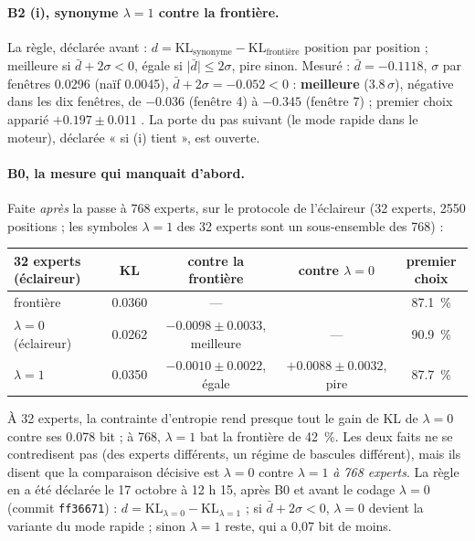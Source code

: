 \paragraph{B2 (i), synonyme $\lambda = 1$ contre la frontière.} La règle, déclarée avant : $d = \mathrm{KL}_{\text{synonyme}} - \mathrm{KL}_{\text{frontière}}$ position par position ; meilleure si $\bar d + 2\sigma < 0$, égale si $\lvert \bar d\rvert \le 2\sigma$, pire sinon. Mesuré : $\bar d = -\num{0.1118}$, $\sigma$ par fenêtres \num{0.0296} (naïf \num{0.0045}), $\bar d + 2\sigma = -\num{0.052} < 0$ : \textbf{meilleure} (\num{3.8}\,$\sigma$), négative dans les dix fenêtres, de $-\num{0.036}$ (fenêtre 4) à $-\num{0.345}$ (fenêtre 7) ; premier choix apparié $+\num{0.197} \pm \num{0.011}$ \mes. La porte du pas suivant (le mode rapide dans le moteur), déclarée « si (i) tient », est ouverte.

\paragraph{B0, la mesure qui manquait d'abord.} Faite \emph{après} la passe à 768 experts, sur le protocole de l'éclaireur (32 experts, \num{2550} positions ; les symboles $\lambda = 1$ des 32 experts sont un sous-ensemble des 768) \mes :

\begin{center}\footnotesize
\begin{tabular}{@{}lcccc@{}}
\toprule
32 experts (éclaireur) & KL & contre la frontière & contre $\lambda = 0$ & premier choix \\
\midrule
frontière & \num{0.0360} & --- & & \SI{87.1}{\percent} \\
$\lambda = 0$ (éclaireur) & \num{0.0262} & $-\num{0.0098} \pm \num{0.0033}$, meilleure & --- & \SI{90.9}{\percent} \\
$\lambda = 1$ & \num{0.0350} & $-\num{0.0010} \pm \num{0.0022}$, égale & $+\num{0.0088} \pm \num{0.0032}$, pire & \SI{87.7}{\percent} \\
\bottomrule
\end{tabular}
\end{center}

À 32 experts, la contrainte d'entropie rend presque tout le gain de KL de $\lambda = 0$ contre ses \num{0.078} bit ; à 768, $\lambda = 1$ bat la frontière de \SI{42}{\percent}. Les deux faits ne se contredisent pas (des experts différents, un régime de bascules différent), mais ils disent que la comparaison décisive est $\lambda = 0$ contre $\lambda = 1$ \emph{à 768 experts}. La règle en a été déclarée le 17 octobre à 12 h 15, après B0 et avant le codage $\lambda = 0$ (commit \texttt{ff36671}) : $d = \mathrm{KL}_{\lambda=0} - \mathrm{KL}_{\lambda=1}$ ; si $\bar d + 2\sigma < 0$, $\lambda = 0$ devient la variante du mode rapide ; sinon $\lambda = 1$ reste, qui a 0,07 bit de moins.


